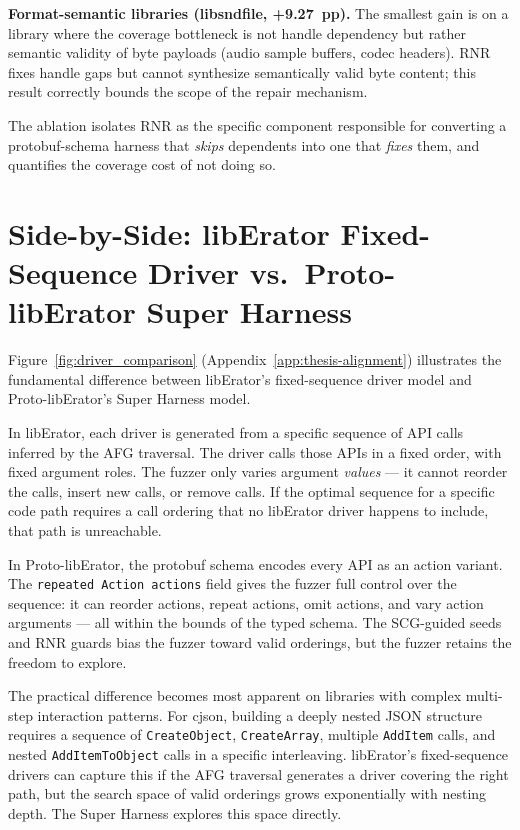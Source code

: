 \textbf{Format-semantic libraries (libsndfile, +9.27~pp).}
The smallest gain is on a library where the coverage bottleneck is not
handle dependency but rather semantic validity of byte payloads (audio
sample buffers, codec headers).  RNR fixes handle gaps but cannot
synthesize semantically valid byte content; this result correctly bounds
the scope of the repair mechanism.

The ablation isolates RNR as the specific component responsible for
converting a protobuf-schema harness that \emph{skips} dependents into
one that \emph{fixes} them, and quantifies the coverage cost of not
doing so.

\section{Side-by-Side: libErator Fixed-Sequence Driver vs.\ Proto-libErator Super Harness}
\label{sec:eval_driver_comparison}

Figure~\ref{fig:driver_comparison} (Appendix~\ref{app:thesis-alignment}) illustrates the fundamental difference between libErator's fixed-sequence driver model and Proto-libErator's Super Harness model.

In libErator, each driver is generated from a specific sequence of API calls inferred by the AFG traversal. The driver calls those APIs in a fixed order, with fixed argument roles. The fuzzer only varies argument \emph{values} — it cannot reorder the calls, insert new calls, or remove calls. If the optimal sequence for a specific code path requires a call ordering that no libErator driver happens to include, that path is unreachable.

In Proto-libErator, the protobuf schema encodes every API as an action variant. The \texttt{repeated Action actions} field gives the fuzzer full control over the sequence: it can reorder actions, repeat actions, omit actions, and vary action arguments — all within the bounds of the typed schema. The SCG-guided seeds and RNR guards bias the fuzzer toward valid orderings, but the fuzzer retains the freedom to explore.

The practical difference becomes most apparent on libraries with complex multi-step interaction patterns. For cjson, building a deeply nested JSON structure requires a sequence of \texttt{CreateObject}, \texttt{CreateArray}, multiple \texttt{AddItem} calls, and nested \texttt{AddItemToObject} calls in a specific interleaving. libErator's fixed-sequence drivers can capture this if the AFG traversal generates a driver covering the right path, but the search space of valid orderings grows exponentially with nesting depth. The Super Harness explores this space directly.


